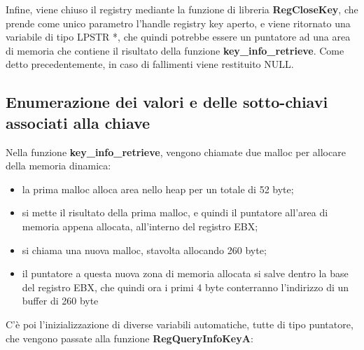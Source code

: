 \documentclass[12pt]{extarticle}
\begin{document}
Infine, viene chiuso il registry mediante la funzione di libreria \textbf{RegCloseKey}, che prende come unico parametro l'handle registry key aperto, e viene ritornato una variabile di tipo LPSTR *, che quindi potrebbe essere un puntatore ad una area di memoria che contiene il risultato della funzione \textbf{key\_info\_retrieve}. Come detto precedentemente, in caso di fallimenti viene restituito NULL.
\subsection{Enumerazione dei valori e delle sotto-chiavi associati alla chiave}
Nella funzione \textbf{key\_info\_retrieve}, vengono chiamate due malloc per allocare della memoria dinamica:
\begin{itemize}
\item la prima malloc alloca area nello heap per un totale di 52 byte;
\item si mette il risultato della prima malloc, e quindi il puntatore all'area di memoria appena allocata, all'interno del registro EBX;
\item si chiama una nuova malloc, stavolta allocando 260 byte;
\item il puntatore a questa nuova zona di memoria allocata si salve dentro la base del registro EBX, che quindi ora i primi 4 byte conterranno l'indirizzo di un buffer di 260 byte
\end{itemize} 
C'è poi l'inizializzazione di diverse variabili automatiche, tutte di tipo puntatore, che vengono passate alla funzione \textbf{RegQueryInfoKeyA}:
\end{document}
